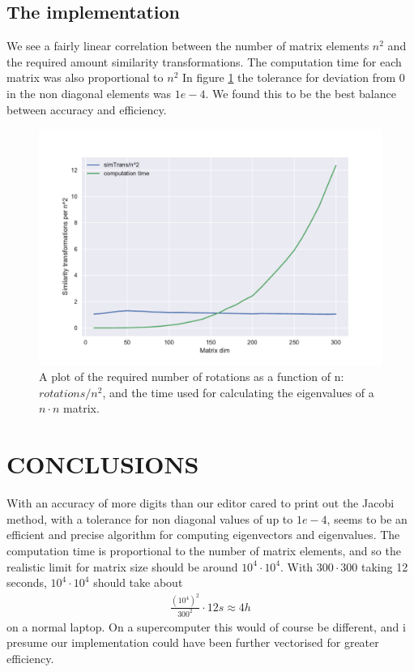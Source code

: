 \documentclass[a4paper]{article}
\begin{document}
\subsection{The implementation}
We see a fairly linear correlation between the number of matrix elements $n^2$ and the required amount similarity transformations. The computation time for each matrix was also proportional to $n^2$ In figure \ref{computation time plot} the tolerance for deviation from 0 in the non diagonal elements was $1e-4$. We found this to be the best balance between accuracy and efficiency. 
\begin{figure}[h!]
	\centering 
	\includegraphics[scale=0.7]{../requiredRotations.pdf}
	\caption{A plot of the required number of rotations as a function of n: $rotations/n^2$, and the time used for calculating the eigenvalues of a $n\cdot n$ matrix.}
	\label{computation time plot}
\end{figure}

\section{CONCLUSIONS}
With an accuracy of more digits than our editor cared to print out the Jacobi method, with a tolerance for non diagonal values of up to $1e-4$, seems to be an efficient and precise algorithm for computing eigenvectors and eigenvalues. The computation time is proportional to the number of matrix elements, and so the realistic limit for matrix size should be around $10^4 \cdot 10^4$. With $300 \cdot 300$ taking 12 seconds, $10^4 \cdot 10^4$ should take about
\begin{align}
\frac{(10^4)^2}{300^2}\cdot 12s\approx 4h
\end{align}
on a normal laptop. On a supercomputer this would of course be different, and i presume our implementation could have been further vectorised for greater efficiency.
\end{document}
